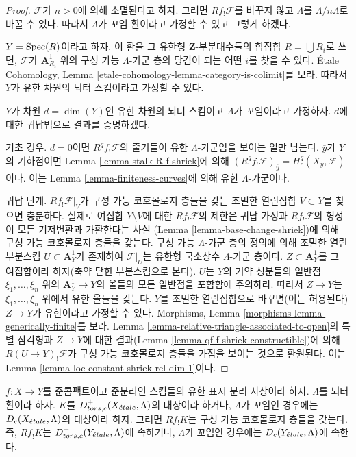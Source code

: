 \begin{proof}
$\mathcal{F}$가 $n > 0$에 의해 소멸된다고 하자.
그러면 $Rf_!\mathcal{F}$를 바꾸지 않고 $\Lambda$를
$\Lambda/n\Lambda$로 바꿀 수 있다. 따라서 $\Lambda$가 꼬임 환이라고
가정할 수 있고 그렇게 하겠다.

\medskip\noindent
$Y = \mathop{\mathrm{Spec}}(R)$이라고 하자. 이 환을 그 유한형
$\mathbf{Z}$-부분대수들의 합집합 $R = \bigcup R_i$로 쓰면,
$\mathcal{F}$가 $\mathbf{A}^1_{R_i}$ 위의 구성 가능
$\Lambda$-가군 층의 당김이 되는 어떤 $i$를 찾을 수 있다.
\'Etale Cohomology, Lemma
\ref{etale-cohomology-lemma-category-is-colimit}를 보라.
따라서 $Y$가 유한 차원의 뇌터 스킴이라고 가정할 수 있다.

\medskip\noindent
$Y$가 차원 $d = \dim(Y)$인 유한 차원의 뇌터 스킴이고
$\Lambda$가 꼬임이라고 가정하자. $d$에 대한 귀납법으로 결과를
증명하겠다.

\medskip\noindent
기초 경우. $d = 0$이면 $R^qf_!\mathcal{F}$의 줄기들이 유한
$\Lambda$-가군임을 보이는 일만 남는다.
$\overline{y}$가 $Y$의 기하점이면 Lemma
\ref{lemma-stalk-R-f-shriek}에 의해
$(R^qf_!\mathcal{F})_{\overline{y}} = H^q_c(X_{\overline{y}}, \mathcal{F})$이다.
이는 Lemma \ref{lemma-finiteness-curves}에 의해 유한
$\Lambda$-가군이다.

\medskip\noindent
귀납 단계. $Rf_!\mathcal{F}|_V$가 구성 가능 코호몰로지 층들을 갖는
조밀한 열린집합 $V \subset Y$를 찾으면 충분하다. 실제로 여집합
$Y \setminus V$에 대한 $Rf_!\mathcal{F}$의 제한은 귀납 가정과
$Rf_!\mathcal{F}$의 형성이 모든 기저변환과 가환한다는 사실
(Lemma \ref{lemma-base-change-shriek})에 의해 구성 가능 코호몰로지
층들을 갖는다.
구성 가능 $\Lambda$-가군 층의 정의에 의해 조밀한 열린 부분스킴
$U \subset \mathbf{A}^1_Y$가 존재하여 $\mathcal{F}|_U$는 유한형
국소상수 $\Lambda$-가군 층이다.
$Z \subset \mathbf{A}^1_Y$를 그 여집합이라 하자(축약 닫힌
부분스킴으로 본다). $U$는 $Y$의 기약 성분들의 일반점
$\xi_1, \ldots, \xi_n$ 위의 $\mathbf{A}^1_Y \to Y$의 올들의 모든
일반점을 포함함에 주의하라. 따라서 $Z \to Y$는
$\xi_1, \ldots, \xi_n$ 위에서 유한 올들을 갖는다.
$Y$를 조밀한 열린집합으로 바꾸면(이는 허용된다)
$Z \to Y$가 유한이라고 가정할 수 있다. Morphisms, Lemma
\ref{morphisms-lemma-generically-finite}를 보라.
Lemma \ref{lemma-relative-triangle-associated-to-open}의 특별 삼각형과
$Z \to Y$에 대한 결과(Lemma
\ref{lemma-qf-f-shriek-constructible})에 의해
$R(U \to Y)_!\mathcal{F}$가 구성 가능 코호몰로지 층들을 가짐을
보이는 것으로 환원된다. 이는 Lemma
\ref{lemma-loc-constant-shriek-rel-dim-1}이다.
\end{proof}


\begin{theorem}
\label{theorem-constructible-shriek}
$f : X \to Y$를 준콤팩트이고 준분리인 스킴들의 유한 표시 분리
사상이라 하자. $\Lambda$를 뇌터 환이라 하자. $K$를
$D^+_{tors, c}(X_{\acute{e}tale}, \Lambda)$의 대상이라 하거나,
$\Lambda$가 꼬임인 경우에는 $D_c(X_{\acute{e}tale}, \Lambda)$의 대상이라 하자.
그러면 $Rf_!K$는 구성 가능 코호몰로지 층들을 갖는다. 즉,
$Rf_!K$는 $D^+_{tors, c}(Y_{\acute{e}tale}, \Lambda)$에 속하거나,
$\Lambda$가 꼬임인 경우에는 $D_c(Y_{\acute{e}tale}, \Lambda)$에 속한다.
\end{theorem}

